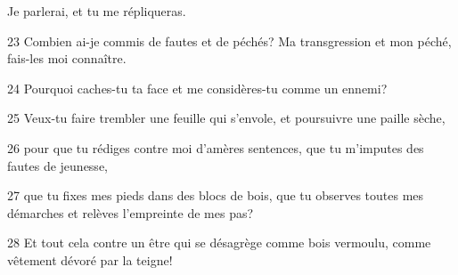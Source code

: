 Je parlerai, et tu me répliqueras.

23 Combien ai-je commis de fautes et de péchés? Ma transgression et mon péché, fais-les moi connaître.

24 Pourquoi caches-tu ta face et me considères-tu comme un ennemi?

25 Veux-tu faire trembler une feuille qui s’envole, et poursuivre une paille sèche,

26 pour que tu rédiges contre moi d’amères sentences, que tu m’imputes des fautes de jeunesse,

27 que tu fixes mes pieds dans des blocs de bois, que tu observes toutes mes démarches et relèves l’empreinte de mes pas?

28 Et tout cela contre un être qui se désagrège comme bois vermoulu, comme vêtement dévoré par la teigne!